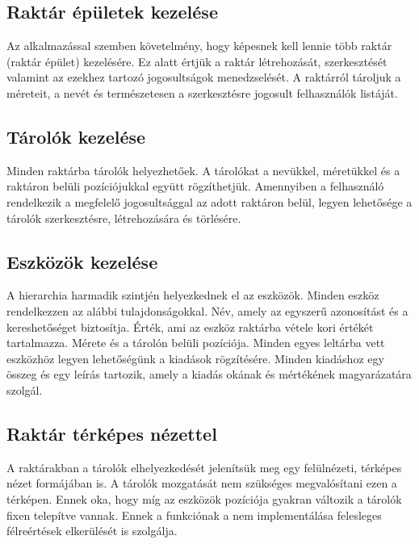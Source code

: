\subsection{Raktár épületek kezelése}
Az alkalmazással szemben követelmény, hogy képesnek kell lennie több raktár (raktár épület) kezelésére.
Ez alatt értjük a raktár létrehozását, szerkesztését valamint az ezekhez tartozó jogosultságok menedzselését.
A raktárról tároljuk a méreteit, a nevét és természetesen a szerkesztésre jogosult felhasználók listáját.

\subsection{Tárolók kezelése}
Minden raktárba tárolók helyezhetőek. A tárolókat a nevükkel, méretükkel és a raktáron belüli pozíciójukkal együtt rögzíthetjük.
Amennyiben a felhasználó rendelkezik a megfelelő jogosultsággal az adott raktáron belül, legyen lehetősége a tárolók szerkesztésre, létrehozására és törlésére.

\subsection{Eszközök kezelése}
A hierarchia harmadik szintjén helyezkednek el az eszközök. 
Minden eszköz rendelkezzen az alábbi tulajdonságokkal.
Név, amely az egyszerű azonosítást és a kereshetőséget biztosítja.
Érték, ami az eszköz raktárba vétele kori értékét tartalmazza.
Mérete és a tárolón belüli pozíciója.
Minden egyes leltárba vett eszközhöz legyen lehetőségünk a kiadások rögzítésére.
Minden kiadáshoz egy összeg és egy leírás tartozik, amely a kiadás okának és mértékének magyarázatára szolgál.

\subsection{Raktár térképes nézettel}
A raktárakban a tárolók elhelyezkedését jelenítsük meg egy felülnézeti, térképes nézet formájában is.
A tárolók mozgatását nem szükséges megvalósítani ezen a térképen.
Ennek oka, hogy míg az eszközök pozíciója gyakran változik a tárolók fixen telepítve vannak.
Ennek a funkciónak a nem implementálása felesleges félreértések elkerülését is szolgálja.

